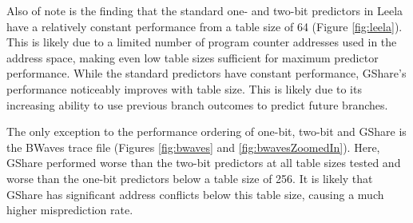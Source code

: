 \clearpage

Also of note is the finding that the standard one- and two-bit predictors in Leela have a relatively constant performance from a table size of 64 (Figure \ref{fig:leela}). This is likely due to a limited number of program counter addresses used in the address space, making even low table sizes sufficient for maximum predictor performance. While the standard predictors have constant performance, GShare's performance noticeably improves with table size. This is likely due to its increasing ability to use previous branch outcomes to predict future branches.

The only exception to the performance ordering of one-bit, two-bit and GShare is the BWaves trace file (Figures \ref{fig:bwaves} and \ref{fig:bwavesZoomedIn}). Here, GShare performed worse than the two-bit predictors at all table sizes tested and worse than the one-bit predictors below a table size of 256. It is likely that GShare has significant address conflicts below this table size, causing a much higher misprediction rate.

